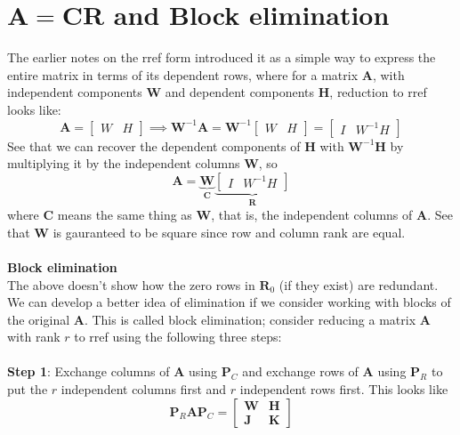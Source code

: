 \documentclass{report}
\begin{document}
\section{$\bm A=\bm{CR}$ and Block elimination}
The earlier notes on the rref form introduced it as a simple way to express the entire matrix in terms of its dependent rows, where for a matrix $\bm A$, with independent
components $\bm W$ and dependent components $\bm H$, reduction to rref looks like:
\begin{equation*}
\bm A=\left[\begin{array}{cc}W&H\end{array}\right]\implies
\bm W^{-1}\bm A=\bm W^{-1}\left[\begin{array}{cc}W&H\end{array}\right]=
\left[\begin{array}{cc}I&W^{-1}H\end{array}\right]
\end{equation*}
See that we can recover the dependent components of $\bm H$ with $\bm W^{-1}\bm H$ by multiplying it by the independent columns $\bm W$, so
\begin{equation*}
\bm A=\underbrace{\bm W}_{\bm C}\underbrace{\left[\begin{array}{cc}I&W^{-1}H\end{array}\right]}_{\bm R}
\end{equation*}
where $\bm C$ means the same thing as $\bm W$, that is, the independent columns of $\bm A$. See that
$\bm W$ is gauranteed to be square since row and column rank are equal.\\
\vspace{1mm}\\
\textbf{Block elimination}\\
The above doesn't show how the zero rows in $\bm R_0$ (if they exist) are redundant. 
We can develop a better idea of elimination if we consider working with blocks of the original $\bm A$. This is called block elimination; consider reducing
a matrix $\bm A$ with rank $r$ to rref using the following three steps:\\
\vspace{1mm}\\
\textbf{Step 1}: Exchange columns of $\bm A$ using $\bm P_C$ and exchange rows of $\bm A$ using $\bm P_R$ to put the $r$ independent columns first and $r$ independent rows 
first. This looks like
\begin{equation*}
\bm P_R\bm A\bm P_C=\left[\begin{array}{cc}
\bm W&\bm H\\
\bm J&\bm K\end{array}\right]
\end{equation*}
\end{document}
